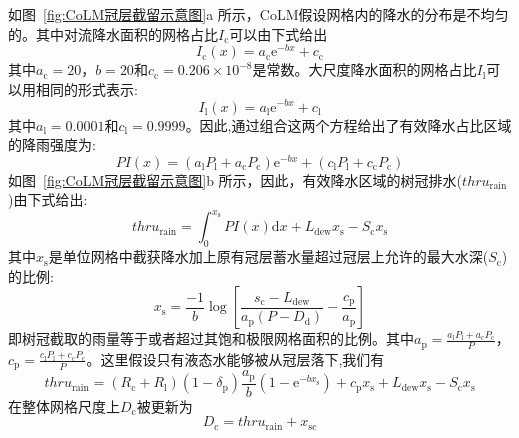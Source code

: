 如图~\ref{fig:CoLM冠层截留示意图}a 所示，CoLM假设网格内的降水的分布是不均匀的。其中对流降水面积的网格占比$I_{\mathrm {c}} $可以由下式给出
\begin{equation}
  I_{\mathrm{c}}(x)=a_{\mathrm{c}} {\mathrm e}^{-bx}+c_{\mathrm{c}}
\end{equation}
其中$a_{\mathrm {c}} =20$，$b=20$和$c_{\mathrm {c}} =0.206\times10^{-8}$是常数。大尺度降水面积的网格占比$I_{\mathrm {l}} $可以用相同的形式表示:
\begin{equation}
  I_{\mathrm{l}}(x)=a_{\mathrm{l}} {\mathrm e}^{-b x}+c_{\mathrm{l}}
\end{equation}
其中$a_{\mathrm {l}} =0.0001$和$c_{\mathrm {l}} =0.9999$。因此,通过组合这两个方程给出了有效降水占比区域的降雨强度为:
\begin{equation}
  P I(x)=\left(a_{\mathrm{l}} P_{\mathrm{l}}+a_{\mathrm{c}} P_{\mathrm{c}}\right) {\mathrm e}^{-b x}+\left(c_{\mathrm{l}} P_{\mathrm{l}}+c_{\mathrm{c}} P_{\mathrm{c}}\right)
\end{equation}
如图~\ref{fig:CoLM冠层截留示意图}b 所示，因此，有效降水区域的树冠排水($thru_{\mathrm{rain}}$)由下式给出:
\begin{equation}
  thru_{\mathrm{rain}}=\int_{0}^{x_{\mathrm{s}}} P I(x){\mathrm { d}} x+L_{\mathrm{dew}} x_{\mathrm{s}}-S_{\mathrm{c}} x_{\mathrm{s}}
\end{equation}
其中$x_{\mathrm {s}} $是单位网格中截获降水加上原有冠层蓄水量超过冠层上允许的最大水深($S_{\mathrm {c}} $)的比例:
\begin{equation}
  x_{\mathrm{s}}=\frac{-1}{b} \log \left[\frac{s_{\mathrm{c}}-L_{\mathrm{d e w}}}{a_{\mathrm{p}}\left(P-D_{\mathrm{d}}\right)}-\frac{c_{\mathrm{p}}}{a_{\mathrm{p}}}\right]
\end{equation}
即树冠截取的雨量等于或者超过其饱和极限网格面积的比例。其中$a_{\mathrm {p}} =\frac{a_{\mathrm {l}}P_{\mathrm {l}} +a_{\mathrm {c}}P_{\mathrm {c}} }{P}$，$c_{\mathrm {p}} =\frac{c_{\mathrm {l}}P_{\mathrm {l}} +c_{\mathrm {c}}P_{\mathrm {c}} }{P}$。这里假设只有液态水能够被从冠层落下,我们有
\begin{equation}
  thru_{\mathrm{rain}}=\left(R_{\mathrm{c}}+R_{\mathrm{l}}\right)\left(1-\delta_{\mathrm{p}}\right) \frac{a_{\mathrm{p}}}{b}\left(1-{\mathrm e}^{-b x_{\mathrm{s}}}\right)+c_{\mathrm{p}} x_{\mathrm{s}}+L_{\mathrm{dew}} x_{\mathrm{s}}-S_{\mathrm{c}} x_{\mathrm{s}}
\end{equation}
在整体网格尺度上$D_{\mathrm {c}} $被更新为
\begin{equation}
  D_{\mathrm {c}} =thru_{\mathrm{r a i n}}+x_{\mathrm{s c}}
\end{equation}
